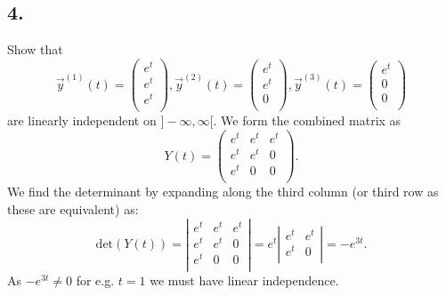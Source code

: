 \subsection*{4.} Show that
\[ 
\Vec{y}^{(1)}(t) = \begin{pmatrix}
 e^{t} \\
 e^{t}\\
 e^{t}\\
\end{pmatrix}, \Vec{y}^{(2)}(t) = \begin{pmatrix}
 e^{t} \\
 e^{t} \\
0\\
\end{pmatrix}, \Vec{y}^{(3)}(t) = \begin{pmatrix}
 e^{t}\\
0\\
0\\
\end{pmatrix}
\]
are linearly independent on $]-\infty,\infty[$.
\bigbreak
We form the combined matrix as
\[ 
Y(t) = \begin{pmatrix}
 e^{t} & e^{t} & e^{t}\\
 e^{t} & e^{t} & 0\\
 e^{t} & 0 & 0\\
\end{pmatrix}
.\]
We find the determinant by expanding along the third column (or third row as these are equivalent) as:
\[ 
\mathrm{det}(Y(t)) = \left| \begin{array}{ccc}
 e^{t} & e^{t} & e^{t}\\
 e^{t} & e^{t} & 0\\
 e^{t} & 0 & 0\\
\end{array} \right| = e^{t} \left| \begin{array}{cc}
 e^{t} & e^{t}\\
 e^{t} & 0\\
\end{array} \right| = - e^{3t}
.\]
As $-e^{3t} \neq 0$ for e.g. $t = 1$ we must have linear independence.


